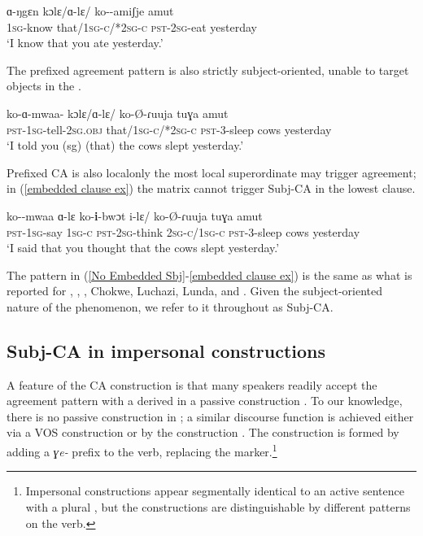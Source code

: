 \documentclass[output=paper
,newtxmath
,modfonts
,nonflat]{langsci/langscibook}
\begin{document}
\ea \label{No Embedded Sbj}
\gll ɑ-ŋgɛn kɔlɛ/ɑ-lɛ/ ko--amiʃje amut \\
1\textsc{sg}-know that/1\textsc{sg-c/*}2\textsc{sg-c} \textsc{pst}-2\textsc{sg}-eat yesterday \\
\glt `I know that you ate yesterday.'
\z

\noindent The prefixed agreement pattern is also strictly subject-oriented, unable to target objects in the .

\ea
\gll ko-ɑ-mwaa- kɔlɛ/ɑ-lɛ/ ko-\O-ɾuuja tuɣa amut \\
\textsc{pst}-1\textsc{sg}-tell-2\textsc{sg}.\textsc{obj} that/1\textsc{sg-c/*}2\textsc{sg-c} \textsc{pst}-3-sleep cows yesterday \\
\glt `I told you (sg) (that) the cows slept yesterday.'
\z

\noindent Prefixed CA is also local\textemdash only the most local superordinate  may trigger agreement; in (\ref{embedded clause ex}) the matrix  cannot trigger Subj-CA in the lowest clause.

\ea \label{embedded clause ex}
\gll ko--mwaa ɑ-lɛ ko-\textbf{i}-bwɔt i-lɛ/ ko-\O-ɾuuja tuɣa amut\\
\textsc{pst}-1\textsc{sg}-say 1\textsc{sg-c} \textsc{pst}-2\textsc{sg}-think 2\textsc{sg-c/}1\textsc{sg-c} \textsc{pst}-3-sleep cows yesterday\\
\glt `I said that you thought that the cows slept yesterday.'
\z

\noindent The pattern in (\ref{No Embedded Sbj}-\ref{embedded clause ex}) is the same as what is reported for  \citep{Diercks:2013},  \citep{LetsholoSafir:2017},  \citep{Torrence:2016}, Chokwe, Luchazi, Lunda, and  \citep{Kawasha:2007}. Given the subject-oriented nature of the phenomenon, we refer to it throughout as Subj-CA.

\subsection{Subj-CA in impersonal constructions} \label{impersonals} \label{NoImpersonalSubj-CA}

A feature of the  CA construction is that many speakers readily accept the agreement pattern with a derived  in a passive construction \citep{Diercks:2010, Diercks:2013}. To our knowledge, there is no passive construction in ; a similar discourse function is achieved either via a VOS construction or by the  construction \citep[cf.][]{Payne:2011}. The  construction is formed by adding a \textit{ɣe-} prefix to the verb, replacing the  marker.\footnote{Impersonal constructions appear segmentally identical to an active sentence with a  plural , but the constructions are distinguishable by different  patterns on the verb.} 
\end{document}
